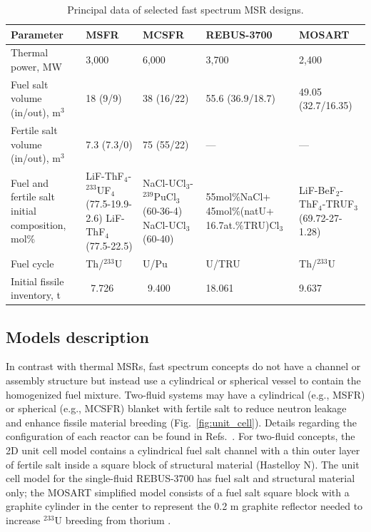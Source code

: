 \documentclass[letterpaper]{mandc2019}
\begin{document}
\begin{table}[!htb]
\vspace{-0.3in}
  \centering
  \caption{Principal data of selected fast spectrum \gls{MSR} designs.}
  \label{table:fsmsr_concepts}
  \begin{tabular}{p{} p{} p{} p{} p{}} \toprule
   Parameter & \gls{MSFR} & \gls{MCSFR} & REBUS-3700 & \gls{MOSART} \\ \midrule
   Thermal power, MW 				&  3,000 & 6,000     & 3,700 & 2,400   \\
   Fuel salt volume (in/out), m$^3$       &18 (9/9)& 38 (16/22)& 55.6 (36.9/18.7) & 49.05 (32.7/16.35) \\
   Fertile salt volume (in/out), m$^3$ & 7.3 (7.3/0) & 75 (55/22)    & --- & --- \\
   Fuel and fertile salt initial composition, mol\% & LiF-ThF$_4$-$^{233}$UF$_4$ (77.5-19.9-2.6) LiF-ThF$_4$ \newline (77.5-22.5) & NaCl-UCl$_3$-$^{239}$PuCl$_3$ (60-36-4) \newline NaCl-UCl$_3$ \newline (60-40)
   & 55mol\%NaCl+ 45mol\%(natU+ 16.7at.\%TRU)Cl$_3$
   & LiF-BeF$_2$-ThF$_4$-TRUF$_3$  \newline (69.72-27-1.28) \\
   Fuel cycle & Th/$^{233}$U & U/Pu  & U/TRU & Th/$^{233}$U \\
   Initial fissile inventory, t & \ 7.726 & \ 9.400    & 18.061 & 9.637 \\ \bottomrule
   \end{tabular}
   \vspace{-0.5in}
\end{table}
\subsection{Models description}
\label{sec:model}
In contrast with thermal \gls{MSR}s, fast spectrum concepts do not have a channel or assembly structure but instead use a cylindrical or spherical vessel to contain the homogenized fuel mixture. Two-fluid systems may have a cylindrical (e.g., \gls{MSFR}) or spherical (e.g., \gls{MCSFR}) blanket with fertile salt to reduce neutron leakage and enhance fissile material breeding (Fig.~\ref{fig:unit_cell}). Details regarding the configuration of each reactor can be found in Refs.~\cite{euratom_final_2015, simmons_assessment_1974, mourogov_potentialities_2006-1,ignatiev_progress_2007}. For two-fluid concepts, the 2D unit cell model contains a cylindrical fuel salt channel with a thin outer layer of fertile salt inside a square block of structural material (Hastelloy N). The unit cell model for the single-fluid REBUS-3700 has fuel salt and structural material only; the \gls{MOSART} simplified model consists of a fuel salt square block with a graphite cylinder in the center to represent the 0.2 m graphite reflector needed to increase $^{233}$U breeding from thorium \cite{anshuman_chaube_arfc_2018}.
\end{document}
